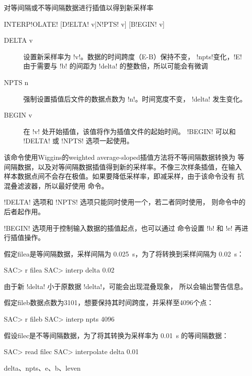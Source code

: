 \label{cmd:interpolate}

对等间隔或不等间隔数据进行插值以得到新采样率

\begin{SACSTX}
INTERP!OLATE! [D!ELTA! v|N!PTS! v] [B!EGIN! v]
\end{SACSTX}

\begin{description}
\item [DELTA v] 设置新采样率为 !v!。数据的时间跨度（E-B）保持不变，
    !npts!变化，!E! 由于需要与 !b! 的间距为 !delta!
    的整数倍，所以可能会有微调
\item [NPTS n] 强制设置插值后文件的数据点数为 !n!。时间宽度不变，
    !delta! 发生变化。
\item [BEGIN v] 在 !v! 处开始插值，该值将作为插值文件的起始时间。
    !BEGIN! 可以和 !DELTA! 或 !NPTS! 选项一起使用。
\end{description}

该命令使用Wiggins的weighted average-sloped插值方法将不等间隔数据转换为
等间隔数据，以及对等间隔数据插值得到新的采样率。不像三次样条插值，在输入
样本数据点间不会存在极值。如果要降低采样率，即减采样，由于该命令没有
抗混叠滤波器，所以最好使用  命令。

!DELTA! 选项和 !NPTS! 选项只能同时使用一个，若二者同时使用，
则命令中的后者起作用。

!BEGIN! 选项用于控制输入数据的插值起点，也可以通过 
命令设置 !b! 和 !e! 再进行插值操作。

假定filea是等间隔数据，采样间隔为 \SI{0.025}{\s}，为了将转换到采样间隔为
\SI{0.02}{\s}：
\begin{SACCode}
SAC> r filea
SAC> interp delta 0.02
\end{SACCode}
由于新 !delta! 小于原数据 !delta!，可能会出现混叠现象，
所以会输出警告信息。

假定fileb数据点数为3101，想要保持其时间跨度，并采样至4096个点：
\begin{SACCode}
SAC> r fileb
SAC> interp npts 4096
\end{SACCode}

假设filec是不等间隔数据，为了将其转换为采样率为 \SI{0.01}{\s} 的等间隔数据：
\begin{SACCode}
SAC> read filec
SAC> interpolate delta 0.01
\end{SACCode}

delta、npts、e、b、leven
